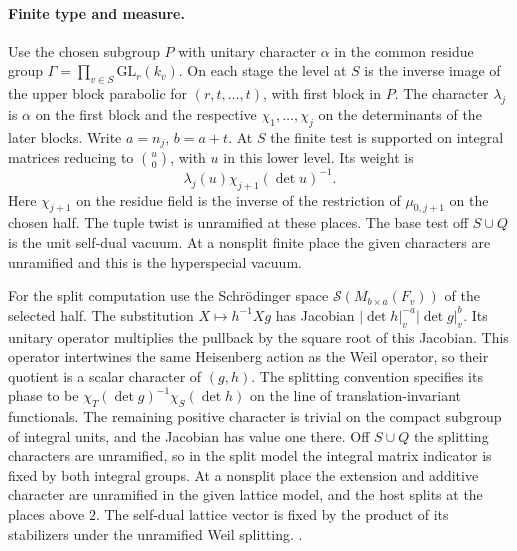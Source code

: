 \paragraph{Finite type and measure.}
Use the chosen subgroup \(P\) with unitary character \(\alpha\)
in the common residue group
\(\Gamma=\prod_{v\in S}\mathrm{GL}_r(k_v)\). On each stage the level at
\(S\) is the inverse image of the upper block parabolic
for \((r,t,\ldots,t)\), with first block in \(P\).
The character \(\lambda_j\) is \(\alpha\) on the first
block and the respective \(\chi_1,\ldots,\chi_j\) on
the determinants of the later blocks. Write
\(a=n_j\), \(b=a+t\). At \(S\) the finite test is
supported on integral matrices reducing to \(\binom{u}{0}\),
with \(u\) in this lower level. Its weight is
\[
 \lambda_j(u)\chi_{j+1}(\det u)^{-1}.
 \tag{F}
\]
Here \(\chi_{j+1}\) on the residue field is the inverse
of the restriction of \(\mu_{0,j+1}\) on the chosen
half. The tuple twist is unramified at these places.
The base test off \(S\cup Q\) is the unit self-dual
vacuum. At a nonsplit finite place the given characters
are unramified and this is the hyperspecial vacuum.

For the split computation use the Schr\"odinger space
\(\mathcal S(M_{b\times a}(F_v))\) of the selected half.
The substitution \(X\mapsto h^{-1}Xg\) has Jacobian
\(|\det h|_v^{-a}|\det g|_v^b\). Its unitary operator multiplies
the pullback by the square root of this Jacobian. This operator
intertwines the same Heisenberg action as the Weil operator, so
their quotient is a scalar character of \((g,h)\). The
splitting convention specifies its phase to be
\(\chi_T(\det g)^{-1}\chi_S(\det h)\) on the
line of translation-invariant functionals. The remaining
positive character is trivial on the compact subgroup of integral
units, and the Jacobian has value one there. Off \(S\cup Q\)
the splitting characters are unramified, so in the split model
the integral matrix indicator is fixed by both integral groups.
At a nonsplit place the extension and additive character are
unramified in the given lattice model, and the host splits at the
places above \(2\). The self-dual lattice vector is fixed by the
product of its stabilizers under the unramified Weil splitting.
.

